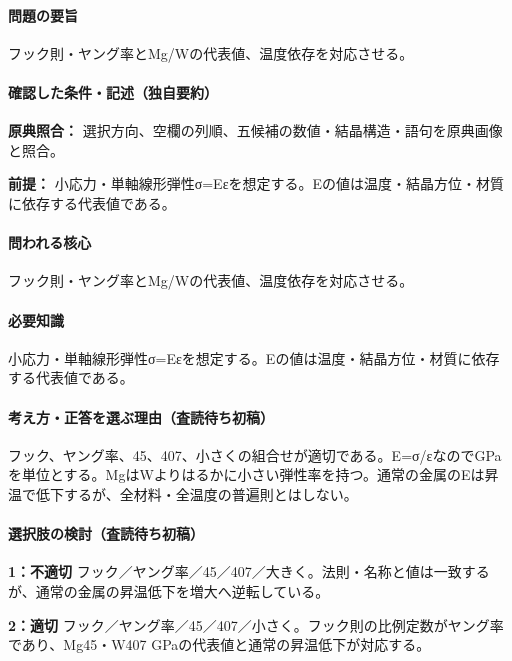 \paragraph{問題の要旨} フック則・ヤング率とMg/Wの代表値、温度依存を対応させる。

\paragraph{確認した条件・記述（独自要約）}\mbox{}\par

\noindent\textbf{原典照合：} 選択方向、空欄の列順、五候補の数値・結晶構造・語句を原典画像と照合。\par

\noindent\textbf{前提：} 小応力・単軸線形弾性σ=Eεを想定する。Eの値は温度・結晶方位・材質に依存する代表値である。\par

\paragraph{問われる核心} フック則・ヤング率とMg/Wの代表値、温度依存を対応させる。

\paragraph{必要知識} 小応力・単軸線形弾性σ=Eεを想定する。Eの値は温度・結晶方位・材質に依存する代表値である。

\paragraph{考え方・正答を選ぶ理由（査読待ち初稿）} フック、ヤング率、45、407、小さくの組合せが適切である。E=σ/εなのでGPaを単位とする。MgはWよりはるかに小さい弾性率を持つ。通常の金属のEは昇温で低下するが、全材料・全温度の普遍則とはしない。

\paragraph{選択肢の検討（査読待ち初稿）}\mbox{}\par

\noindent\textbf{1：不適切} フック／ヤング率／45／407／大きく。法則・名称と値は一致するが、通常の金属の昇温低下を増大へ逆転している。\par

\noindent\textbf{2：適切} フック／ヤング率／45／407／小さく。フック則の比例定数がヤング率であり、Mg45・W407 GPaの代表値と通常の昇温低下が対応する。\par

